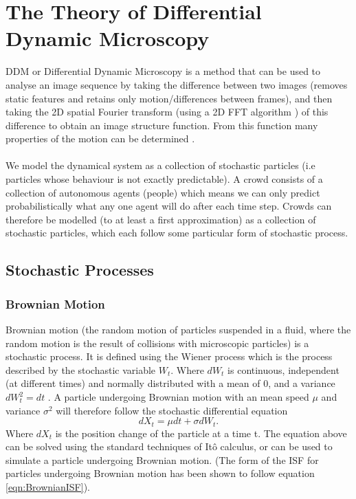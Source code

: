 \documentclass[10pt]{article}
\begin{document}
\section{The Theory of Differential Dynamic Microscopy}
\label{section:theory}
DDM or Differential Dynamic Microscopy is a method that can be used to analyse an image sequence by taking the difference between two images (removes static features and retains only motion/differences between frames), and then taking the 2D spatial Fourier transform (using a 2D FFT algorithm \cite{fft}) of this difference to obtain an image structure function.
From this function many properties of the motion can be determined \cite{ddm1}. 
\\\\
We model the dynamical system as a collection of stochastic particles (i.e particles whose behaviour is not exactly predictable). A crowd consists of a collection of autonomous agents (people) which means we can only predict probabilistically what any one agent will do after each time step. Crowds can therefore be modelled (to at least a first approximation) as a collection of stochastic particles, which each follow some particular form of stochastic process.

\subsection{Stochastic Processes}
\subsubsection{Brownian Motion}
Brownian motion (the random motion of particles suspended in a fluid, where the random motion is the result of collisions with microscopic particles) is a stochastic process. It is defined using the Wiener process which is the process described by the stochastic variable $W_t$. Where $dW_t$ is continuous, independent (at different times) and normally distributed with a mean of 0, and a variance $dW_t^2 = dt$ \cite{sde}. A particle undergoing Brownian motion with an mean speed $\mu$ and variance $\sigma^2$ will therefore follow the stochastic differential equation
\begin{equation}
\label{eqn:brownianSDE}
dX_t = \mu dt + \sigma dW_t.
\end{equation}
Where $dX_t$ is the position change of the particle at a time t. The equation above can be solved using the standard techniques of Itô calculus, or can be used to simulate a particle undergoing Brownian motion. (The form of the ISF for particles undergoing Brownian motion has been shown to follow equation \ref{eqn:BrownianISF}).
\end{document}
